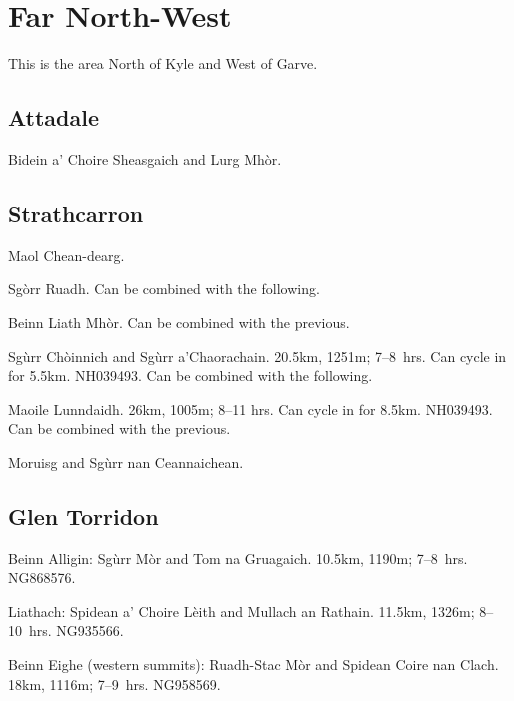 \section{Far North-West}

This is the area North of Kyle and West of Garve.

\subsection{Attadale}

\begin{munros}
\item
Bidein a' Choire Sheasgaich and Lurg Mhòr.  \tick
\end{munros}


\subsection{Strathcarron}


\begin{munros}
\item
Maol Chean-dearg.

\item
Sgòrr Ruadh.  Can be combined with the following.

\item
Beinn Liath Mhòr.  Can be combined with the previous. 

\item\target
Sgùrr Chòinnich and Sgùrr a'Chaorachain.  20.5km, 1251m; 7--8~hrs.  Can cycle
in for 5.5km.   NH039493.  Can be combined with the following.  \tick

\item\target Maoile Lunndaidh.  26km, 1005m; 8--11 hrs.  Can cycle in for
  8.5km.  NH039493.  Can be combined with the previous.  \tick

\item
Moruisg and Sgùrr nan Ceannaichean.
\end{munros}


\subsection{Glen Torridon}

\begin{munros}
\item\target Beinn Alligin: Sgùrr Mòr and Tom na Gruagaich.  10.5km, 1190m;
  7--8~hrs. NG868576.  \tick

\item \target
Liathach: Spidean a' Choire Lèith and Mullach an Rathain.  11.5km, 1326m;
8--10~hrs.  NG935566.  \tick

\item \target
Beinn Eighe (western summits): Ruadh-Stac Mòr and Spidean Coire nan Clach.
18km, 1116m; 7--9~hrs.  NG958569.  \tick
\end{munros}

